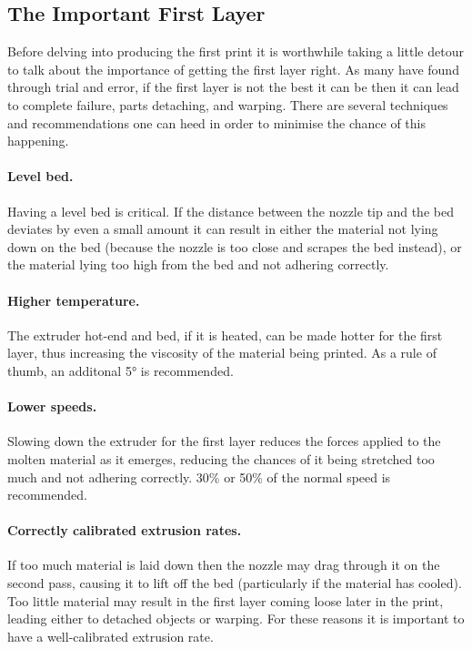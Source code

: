 
\subsection{The Important First Layer}
\label{sec:the_important_first_layer}
Before delving into producing the first print it is worthwhile taking a little detour to talk about the importance of getting the first layer right.  As many have found through trial and error, if the first layer is not the best it can be then it can lead to complete failure, parts detaching, and warping.  There are several techniques and recommendations one can heed in order to minimise the chance of this happening.

\paragraph{Level bed.} %
\label{par:level_bed}
Having a level bed is critical.  If the distance between the nozzle tip and the bed deviates by even a small amount it can result in either the material not lying down on the bed (because the nozzle is too close and scrapes the bed instead), or the material lying too high from the bed and not adhering correctly.

\paragraph{Higher temperature.} %
\label{par:higher_temperature}
The extruder hot-end and bed, if it is heated, can be made hotter for the first layer, thus increasing the viscosity of the material being printed. As a rule of thumb, an additonal 5° is recommended.


\paragraph{Lower speeds.} %
\label{par:lower_speeds}
Slowing down the extruder for the first layer reduces the forces applied to the molten material as it emerges, reducing the chances of it being stretched too much and not adhering correctly. 30\% or 50\% of the normal speed is recommended.

\paragraph{Correctly calibrated extrusion rates.} %
\label{par:correct_extrusion_settings}
If too much material is laid down then the nozzle may drag through it on the second pass, causing it to lift off the bed (particularly if the material has cooled).  Too little material may result in the first layer coming loose later in the print, leading either to detached objects or warping.  For these reasons it is important to have a well-calibrated extrusion rate.


